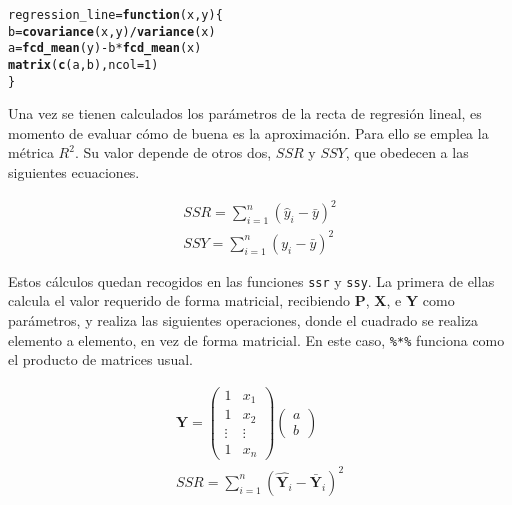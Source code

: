 \documentclass[12pt]{report}\usepackage[]{graphicx}\usepackage[dvipsnames]{xcolor}
\makeatletter
\newcommand{\hlnum}[1]{\textcolor[rgb]{0.686,0.059,0.569}{#1}}%
\newcommand{\hlopt}[1]{\textcolor[rgb]{0,0,0}{#1}}%
\newcommand{\hlstd}[1]{\textcolor[rgb]{0.345,0.345,0.345}{#1}}%
\newcommand{\hlkwa}[1]{\textcolor[rgb]{0.161,0.373,0.58}{\textbf{#1}}}%
\newcommand{\hlkwb}[1]{\textcolor[rgb]{0.69,0.353,0.396}{#1}}%
\newcommand{\hlkwc}[1]{\textcolor[rgb]{0.333,0.667,0.333}{#1}}%
\newcommand{\hlkwd}[1]{\textcolor[rgb]{0.737,0.353,0.396}{\textbf{#1}}}%
\newenvironment{kframe}{%
 \def\at@end@of@kframe{}%
 \ifinner\ifhmode%
  \def\at@end@of@kframe{\end{minipage}}%
  \begin{minipage}{\columnwidth}%
 \fi\fi%
 \def\FrameCommand##1{\hskip\@totalleftmargin \hskip-\fboxsep
 \colorbox{shadecolor}{##1}\hskip-\fboxsep
     \hskip-\linewidth \hskip-\@totalleftmargin \hskip\columnwidth}%
 \MakeFramed {\advance\hsize-\width
   \@totalleftmargin\z@ \linewidth\hsize
   \@setminipage}}%
 {\par\unskip\endMakeFramed%
 \at@end@of@kframe}
\newenvironment{knitrout}{}{} %
\makeatother
\begin{document}
\begin{knitrout}
\color{fgcolor}\begin{kframe}
\begin{alltt}
\hlstd{regression_line} \hlkwb{=} \hlkwa{function}\hlstd{(}\hlkwc{x}\hlstd{,} \hlkwc{y}\hlstd{) \{}
        \hlstd{b} \hlkwb{=} \hlkwd{covariance}\hlstd{(x, y)} \hlopt{/} \hlkwd{variance}\hlstd{(x)}
        \hlstd{a} \hlkwb{=} \hlkwd{fcd_mean}\hlstd{(y)} \hlopt{-} \hlstd{b} \hlopt{*} \hlkwd{fcd_mean}\hlstd{(x)}
        \hlkwd{matrix}\hlstd{(}\hlkwd{c}\hlstd{(a, b),} \hlkwc{ncol} \hlstd{=} \hlnum{1}\hlstd{)}
\hlstd{\}}
\end{alltt}
\end{kframe}
\end{knitrout}
 				
 				Una vez se tienen calculados los parámetros de la recta de regresión lineal, es momento de evaluar cómo de buena es la aproximación. Para ello se emplea la métrica $R^2$. Su valor depende de otros dos, $SSR$ y $SSY$, que obedecen a las siguientes ecuaciones. 
 				
 				$$
 				\begin{gathered}
 					SSR = \sum_{i=1}^n(\hat{y}_i - \bar{y})^2\\
 					SSY = \sum_{i=1}^n(y_i - \bar{y})^2
 				\end{gathered}
 				$$
 				
 				Estos cálculos quedan recogidos en las funciones \texttt{ssr} y \texttt{ssy}. La primera de ellas calcula el valor requerido de forma matricial, recibiendo \textbf{P}, \textbf{X}, e \textbf{Y} como parámetros, y realiza las siguientes operaciones, donde el cuadrado se realiza elemento a elemento, en vez de forma matricial. En este caso, \texttt{\%*\%} funciona como el producto de matrices usual. 
 				
 				$$
 				\begin{gathered}
 					\hat{\textbf{Y}} = \begin{pmatrix}
 						1 & x_1\\
 						1 & x_2\\
 						\vdots & \vdots\\
 						1 & x_n
 					\end{pmatrix}\begin{pmatrix}
 						a\\
 						b
 					\end{pmatrix}\\
 					SSR = \sum_{i=1}^n (\hat{\textbf{Y}_i} - \bar{\textbf{Y}}_i)^2
 				\end{gathered}
 				$$
 				
\end{document}
